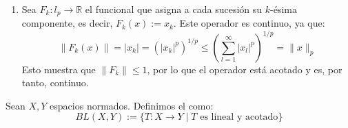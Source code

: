 \begin{ejemplo}
\begin{enumerate}
    \noindent
    Más en general, sea $T: C^0([a,b]) \longrightarrow C^0([a,b])$ definido mediante un núcleo $K(x,t)$ continuo en $[a,b] \times [a,b]$:
    \begin{equation*}
        T(f)(x) = \int_{a}^{b} K(x,t)f(t) \, dt
    \end{equation*}
    Usando la desigualdad de Minkowski (o propiedades básicas de la integral):
    \begin{align*}
        |T(f)(x)| \leq& \int_{a}^{b} |K(x,t)| \cdot |f(t)| \, dt \overset{(*)}{\leq}\int_{a}^{b} |K(x,t)| \cdot \|f\|_\infty \, dt \overset{(**)}{\leq} \|f\|_\infty \int_{a}^{b} \|K\|_\infty \, dt = \\
        =& \|f\|_\infty \cdot \|K\|_\infty \int_{a}^{b} dt = |b-a| \cdot \|K\|_\infty \cdot \|f\|_\infty
    \end{align*}
    donde en $(*)$ hemos acotado a $|f(t)|$ por $\|f\|_\infty= \sup_{t \in [a,b]} |f(t)|$, es decir, su máximo valor absoluto en el intervalo $[a,b]$, y en $(**)$ hemos hecho lo mismo para $|K(x,t)|$.  \\
    \noindent
    Definiendo $M = |b-a| \cdot \|K\|_\infty$, se tiene $\|Tf\|_\infty \leq M \|f\|_\infty$, lo que demuestra que $T$ es continuo.
    
    \item Sea $F_k: l_p \longrightarrow \mathbb{R}$ el funcional que asigna a cada sucesión su $k$-ésima componente, es decir, $F_k(x) := x_k$. Este operador es continuo, ya que:
    \begin{equation*}
        \|F_k(x)\| = |x_k| = \left( |x_k|^p \right)^{1/p} \leq \left( \sum_{l=1}^{\infty} |x_l|^p \right)^{1/p} = \|x\|_{p}
    \end{equation*}
    Esto muestra que $\|F_k\| \leq 1$, por lo que el operador está acotado y es, por tanto, continuo.
\end{enumerate}
\end{ejemplo}

\begin{definicion}
    Sean $X, Y$ espacios normados. Definimos el  como:
    \begin{equation*}
        BL(X, Y) := \{ T: X \longrightarrow Y \mid T \text{ es lineal y acotado} \}
    \end{equation*}
\end{definicion}

